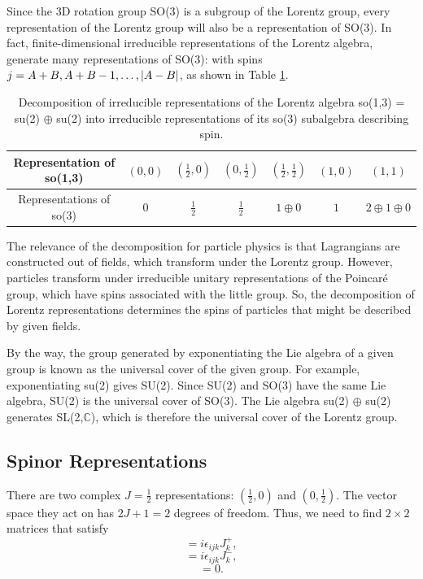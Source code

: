 \documentclass[11pt]{article}
\theoremstyle{definition}
\begin{document}
Since the 3D rotation group SO(3) is a subgroup of the Lorentz group, every representation of the Lorentz group will also be a representation of SO(3). In fact, finite-dimensional irreducible representations of the Lorentz algebra,  generate many representations of SO(3): with spins $j= A+B, A+B-1, \ldots, \abs{A-B}$, as shown in Table \ref{Tab Group}.
\begin{table}[ht]
    \centering
    \begin{tabular}{c|c|c|c|c|c|c}
        Representation of so(1,3)&$(0,0)$ & $\left(\frac{1}{2},0\right)$ & $\left(0,\frac{1}{2}\right)$ & $\left(\frac{1}{2},\frac{1}{2}\right)$ & $(1,0)$ & $(1,1)$ \\ 
        \hline
        Representations of so(3)&$0$ & $\frac{1}{2}$ & $\frac{1}{2}$ & $1 \oplus 0$ & $1$ & $2 \oplus 1 \oplus 0$ \\
    \end{tabular}
    \caption{Decomposition of irreducible representations of the Lorentz algebra so(1,3) = su(2) $\oplus$ su(2) into irreducible representations of its so(3) subalgebra describing spin.}
    \label{Tab Group}
\end{table}
The relevance of the decomposition for particle physics is that Lagrangians are constructed out of fields, which transform under the Lorentz group. However, particles transform under irreducible unitary representations of the Poincaré group, which have spins associated with the little group. So, the decomposition of Lorentz representations determines the spins of particles that might be described by given fields. 

By the way, the group generated by exponentiating the Lie algebra of a given group is known as the universal cover of the given group. For example, exponentiating su(2) gives SU(2). Since SU(2) and SO(3) have the same Lie algebra, SU(2) is the universal cover of SO(3). The Lie algebra su(2) $\oplus$ su(2) generates SL(2,$\mathbb{C}$), which is therefore the universal cover of the Lorentz group.

\subsection{Spinor Representations}
There are two complex $J=\frac{1}{2}$ representations: $(\frac{1}{2},0)$ and $(0, \frac{1}{2})$. The vector space they act on has $2J+1=2$ degrees of freedom. Thus, we need to find $2\times2$ matrices that satisfy
\begin{equation}
    [J_i^+,J_j^+ ] = i\epsilon_{ijk}J_k^+,
\end{equation}
\begin{equation}
    [J_i^-,J_j^-] = i\epsilon_{ijk}J_k^-,
\end{equation}
\begin{equation}
    [J_i^+,J_j^-] = 0.
\end{equation}
\end{document}
